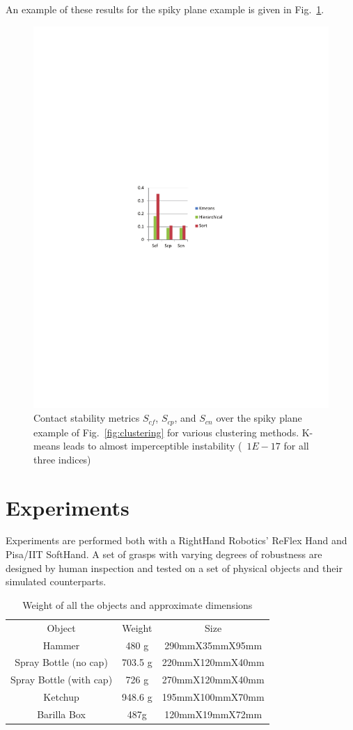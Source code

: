 An example of these results for the spiky plane example is given in Fig.~\ref{fig:SpikyStability}.

\begin{figure}
\centering
\includegraphics[width=0.6\columnwidth]{images/ssoch/spiky_metrics.pdf}
\caption{Contact stability metrics $S_{cf}$, $S_{cp}$, and $S_{cn}$ over the spiky plane example of Fig.~\ref{fig:clustering} for various clustering methods. K-means leads to almost imperceptible instability (~$1E-17$ for all three indices)}
\label{fig:SpikyStability}
\end{figure}


\section{Experiments}
\label{experiments5}

Experiments are performed both with a RightHand Robotics' ReFlex Hand and Pisa/IIT SoftHand.  A set of grasps with varying degrees of robustness are designed by human inspection and tested on a set of physical objects and their simulated counterparts.

\begin{table}[hbt]
   \begin{center}
   \begin{tabular}{| c | c | c |}
   \hline
   Object & Weight & Size \\
   \cline{1-3}
   Hammer                   & 480 g     & 290mmX35mmX95mm      \\\hline
   Spray Bottle (no cap)    & 703.5 g   & 220mmX120mmX40mm      \\\hline
   Spray Bottle (with cap)  & 726 g     & 270mmX120mmX40mm      \\\hline
   Ketchup              & 948.6 g   & 195mmX100mmX70mm   \\\hline
   Barilla Box              & 487g      & 120mmX19mmX72mm      \\\hline
   \end{tabular}
   \end{center}
   \caption{Weight of all the objects and approximate dimensions}
   \label{table:object}
\end{table}



